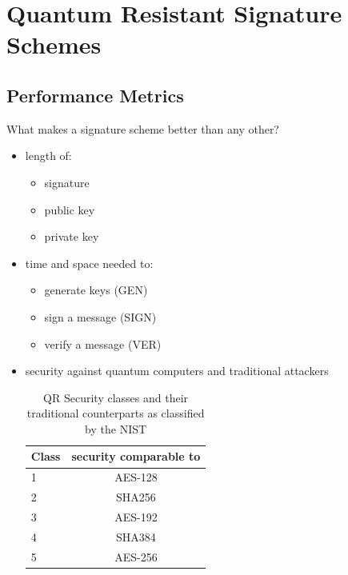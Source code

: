 \documentclass[ucs,10pt]{beamer}
\begin{document}
\section{Quantum Resistant Signature Schemes}
\subsection{Performance Metrics}
\begin{frame}{What makes a signature scheme better than any other?}

  \begin{itemize}
  \item length of:
  \begin{itemize}
    \item signature
    \item public key
    \item private key
  \end{itemize}
    \item time and space needed to:
    \begin{itemize}
      \item generate keys (GEN)
      \item sign a message (SIGN)
      \item verify a message (VER)
    \end{itemize}
  \item security against quantum computers and traditional attackers
  \begin{table}
    \label{QR-classes}
    \centering
    \caption{QR Security classes and their traditional counterparts as classified by the NIST}
    \begin{tabular}{|l | c|}
        \hline
        Class & security comparable to \\
        \hline
        1 & AES-128 \\
        2 & SHA256 \\
        3 & AES-192 \\
        4 & SHA384 \\
        5 & AES-256 \\
        \hline
    \end{tabular} 
\end{table}
\end{itemize}
\end{frame}
\end{document}

